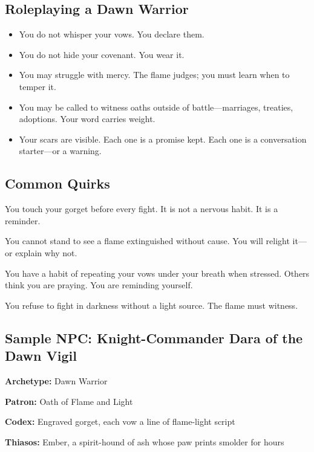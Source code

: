 \subsection{Roleplaying a Dawn Warrior}

\begin{itemize}
\item You do not whisper your vows. You declare them.
\item You do not hide your covenant. You wear it.
\item You may struggle with mercy. The flame judges; you must learn when to temper it.
\item You may be called to witness oaths outside of battle—marriages, treaties, adoptions. Your word carries weight.
\item Your scars are visible. Each one is a promise kept. Each one is a conversation starter—or a warning.
\end{itemize}

\subsection{Common Quirks}

\begin{dice}
\item You touch your gorget before every fight. It is not a nervous habit. It is a reminder.
\item You cannot stand to see a flame extinguished without cause. You will relight it—or explain why not.
\item You have a habit of repeating your vows under your breath when stressed. Others think you are praying. You are reminding yourself.
\item You refuse to fight in darkness without a light source. The flame must witness.
\end{dice}

\subsection{Sample NPC: Knight-Commander Dara of the Dawn Vigil}

\textbf{Archetype:} Dawn Warrior

\textbf{Patron:} Oath of Flame and Light

\textbf{Codex:} Engraved gorget, each vow a line of flame-light script

\textbf{Thiasos:} Ember, a spirit-hound of ash whose paw prints smolder for hours

